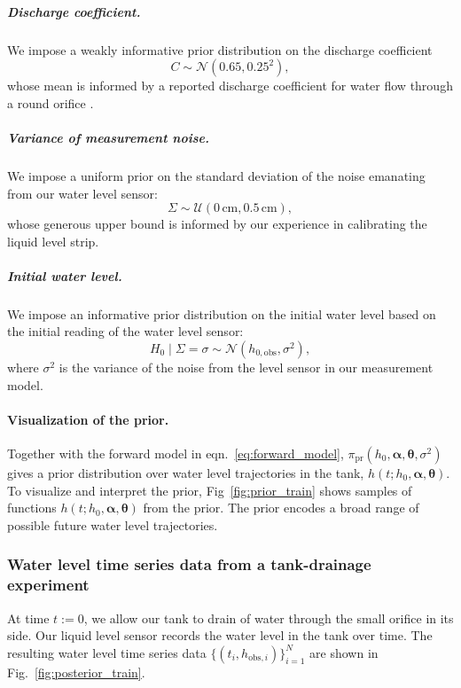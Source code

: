 \documentclass[openacc]{rsproca_new}%
\newcommand\thedata {$\{(t_i,h_{\text{obs}, i})\}_{i=1}^{N}$\xspace}
\newcommand\themodel {$h(t; h_0, \boldsymbol \alpha, \boldsymbol\theta)$\xspace}
\begin{document}


\vspace{-\baselineskip}
\subparagraph{Discharge coefficient.} 
We impose a weakly informative prior distribution on the discharge coefficient
\begin{equation}
	C \sim \mathcal{N}(0.65, 0.25^2),
\end{equation} whose mean is informed by a reported discharge coefficient for water flow through a round orifice \cite{hicks2014determining}. 

\vspace{-\baselineskip}
\subparagraph{Variance of measurement noise.} 
We impose a uniform prior on the standard deviation of the noise emanating from our water level sensor:
\begin{equation}
\Sigma \sim \mathcal{U}(0\,\text{cm}, 0.5\,\text{cm}),
\end{equation} whose generous upper bound is informed by our experience in calibrating the liquid level strip. 

\vspace{-\baselineskip}
\subparagraph{Initial water level.} We impose an informative prior distribution on the initial water level based on the initial reading of the water level sensor:
\begin{equation}
	H_0 \mid \Sigma=\sigma \sim \mathcal{N}(h_{0, \text{obs}}, \sigma^2),
\end{equation} where $\sigma^2$ is the variance of the noise from the level sensor in our measurement model.

\paragraph{Visualization of the prior.}
Together with the forward model in eqn.~\ref{eq:forward_model}, $\pi_{\text{pr}}(h_0, \boldsymbol \alpha, \boldsymbol \theta, \sigma^2)$ gives a prior distribution over water level trajectories in the tank, \themodel. 
To visualize and interpret the prior, Fig~\ref{fig:prior_train} shows samples of functions \themodel from the prior. The prior encodes a broad range of possible future water level trajectories. 

\subsubsection{Water level time series data from a tank-drainage experiment} At time $t:=0$, we allow our tank to drain of water through the small orifice in its side. Our liquid level sensor records the water level in the tank over time. The resulting water level time series data \thedata are shown in Fig.~\ref{fig:posterior_train}.
\end{document}
